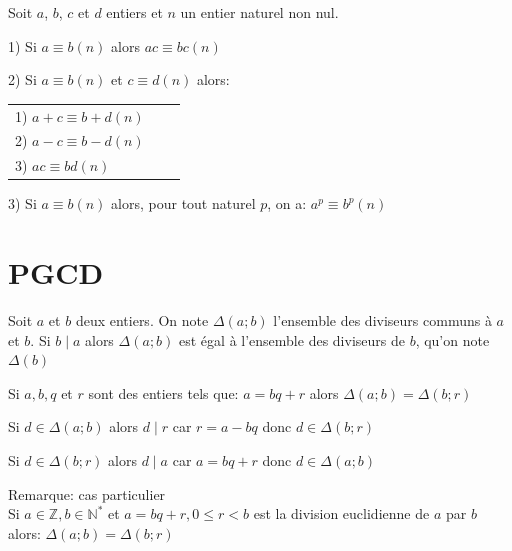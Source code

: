 \documentclass[french]{book}
\begin{document}
\begin{prop}
Soit $a$, $b$, $c$ et $d$ entiers et $n$ un entier naturel non nul.

1) Si $a \equiv b \left( n\right) $ alors $ac \equiv bc \left( n\right) $

2) Si $a \equiv b \left( n\right) $ et $c \equiv d \left( n\right) $ alors:

\begin{tabular}[t]{lll}1) $a+c \equiv b+d \left( n\right) $\\2) $a-c \equiv b-d \left( n\right) $\\3) $ac \equiv bd \left( n\right) $
\end{tabular}

3) Si $a \equiv b \left( n\right) $ alors, pour tout naturel $p$, on a: $a^{p} \equiv b^{p} \left( n\right) $

\end{prop}

\section{PGCD}




\begin{defn}

Soit $a$ et $b$ deux entiers. On note $\Delta\left( a;b\right) $ l'ensemble des diviseurs communs à $a$ et $b$.
Si $b\mid a$ alors $\Delta\left( a;b\right) $ est égal à l'ensemble des diviseurs de $b$, qu'on note $\Delta\left( b\right) $

\end{defn}

\begin{prop}
Si $a, b, q$ et $r$ sont des entiers tels que: $a=bq+r$ alors $\Delta\left( a;b\right)=\Delta\left( b;r\right)  $
 \end{prop}
 
\begin{demo}

Si $d\in \Delta\left( a;b\right)$ alors $d\mid r$ car $r=a-bq$ donc $d\in \Delta\left( b;r\right)$

Si $d\in \Delta\left( b;r\right)$ alors $d\mid a$ car $a=bq+r$ donc $d\in \Delta\left( a;b\right)$


Remarque: cas particulier\\

Si $a\in \mathbb{Z}, b\in\mathbb{N}^{*}$ et $a=bq+r, 0 \leq r < b $ est la division euclidienne de $a$ par $b$ alors: $\Delta\left( a;b\right)=\Delta\left( b;r\right)  $


\end{demo}
\end{document}
